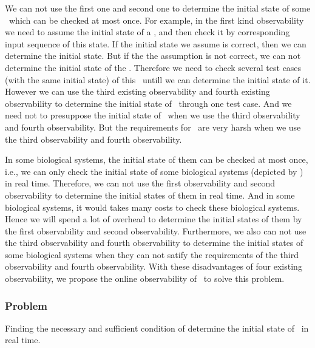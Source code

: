 We can not use the first one and second one to determine the initial state of some \BCNs\ which can be checked at most once. For example, in the first kind observability we need to assume the initial state of a \BCN, and then check it by corresponding input sequence of this state. If the initial state we assume is correct, then we can determine the initial state. But if the the assumption is not correct, we can not determine the initial state of the \BCN. Therefore we need to check several test cases (with the same initial state) of this \BCN\ untill we can determine the initial state of it. However we can use the third existing observability and fourth existing observability to determine the initial state of \BCNs\ through one test case. And we need not to presuppose the initial state of \BCNs\ when we use the third observability and fourth observability. But the requirements for \BCNs\ are very harsh when we use the third observability and fourth observability.
 
In some biological systems, the initial state of them can be checked at most once, i.e., we can only check the initial state of some biological systems (depicted by \BCNs) in real time. Therefore, we can not use the first observability and second observability to determine the initial states of them in real time. And in some biological systems, it would takes many costs to check these biological systems. Hence we will spend a lot of overhead to determine the initial states of them by the first observability and second observability. Furthermore, we also can not use the third observability and fourth observability to determine the initial states of some biological systems when they can not satify the requirements of the third observability and fourth observability. With these disadvantages of four existing observability, we propose the online observability of \BCNs\ to solve this problem.
 \subsubsection*{Problem}
Finding the necessary and sufficient condition of determine the initial state of \BCNs\ in real time.